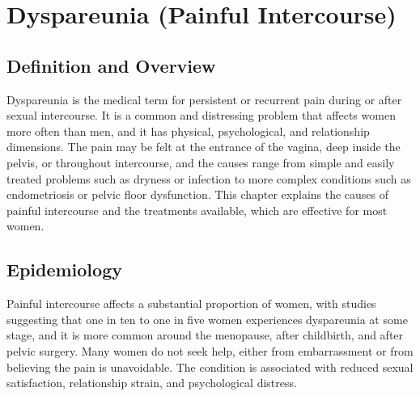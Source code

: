 \chapter{Dyspareunia (Painful Intercourse)}

\section*{Definition and Overview}
Dyspareunia is the medical term for persistent or recurrent pain during or after sexual intercourse. It is a common and distressing problem that affects women more often than men, and it has physical, psychological, and relationship dimensions. The pain may be felt at the entrance of the vagina, deep inside the pelvis, or throughout intercourse, and the causes range from simple and easily treated problems such as dryness or infection to more complex conditions such as endometriosis or pelvic floor dysfunction. This chapter explains the causes of painful intercourse and the treatments available, which are effective for most women.

\section*{Epidemiology}
Painful intercourse affects a substantial proportion of women, with studies suggesting that one in ten to one in five women experiences dyspareunia at some stage, and it is more common around the menopause, after childbirth, and after pelvic surgery. Many women do not seek help, either from embarrassment or from believing the pain is unavoidable. The condition is associated with reduced sexual satisfaction, relationship strain, and psychological distress.

